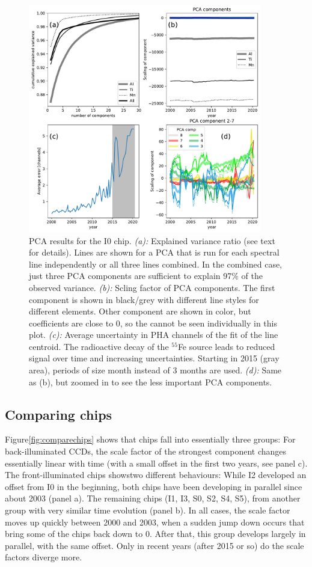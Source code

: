 \documentclass[]{spie}  %
\begin{document}
\begin{figure} [ht]
  \begin{center}
    \includegraphics[height=10cm]{figures/PCA_details_i0.pdf}
  \end{center}
  \caption
      {PCA results for the I0 chip. \emph{(a):} Explained variance ratio (see text for details). Lines are shown for a PCA that is run for each spectral line independently or all three lines combined. In the combined case, just three PCA components are sufficient to explain 97\% of the observed variance. \emph{(b):} Scling factor of PCA components. The first component is shown in black/grey with different line styles for different elements. Other component are shown in color, but coefficients are close to 0, so the cannot be seen individually in this plot. \emph{(c):} Average uncertainty in PHA channels of the fit of the line centroid. The radioactive decay of the $^{55}$Fe source leads to reduced signal over time and increasing uncertainties. Starting in 2015 (gray area), periods of size month instead of 3 months are used. \emph{(d):} Same as (b), but zoomed in to see the less important PCA components.
      \label{fig:explvar}}
\end{figure}

\subsection{Comparing chips}
Figure\ref{fig:comparechips} shows that chips fall into essentially three groups: For back-illuminated CCDs, the scale factor of the strongest component changes essentially linear with time (with a small offset in the first two years, see panel c). The front-illuminated chips showstwo different behaviours: While I2 developed an offset from I0 in the beginning, both chips have been developing in parallel since about 2003 (panel a). The remaining chips (I1, I3, S0, S2, S4, S5), from another group with very similar time evolution (panel b). In all cases, the scale factor moves up quickly between 2000 and 2003, when a sudden jump down occurs that bring some of the chips back down to 0. After that, this group develops largely in parallel, with the same offset. Only in recent years (after 2015 or so) do the scale factors diverge more.
\end{document}
